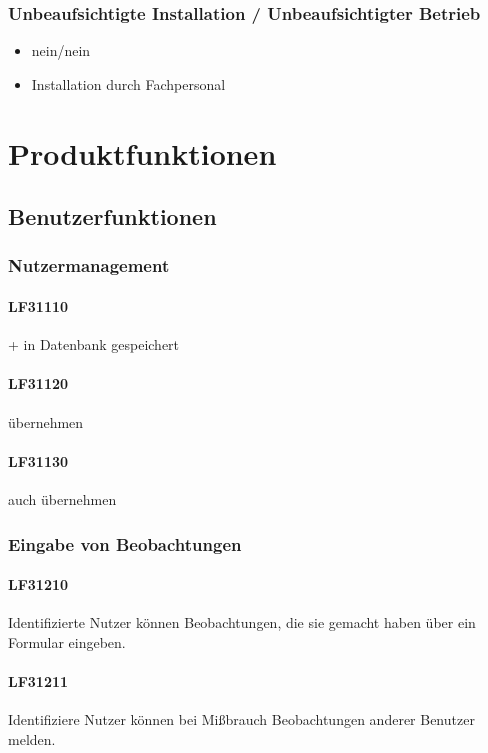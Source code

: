 \documentclass[a4paper,11pt]{article}             %
\begin{document}
\subsubsection{Unbeaufsichtigte Installation / Unbeaufsichtigter Betrieb}
\begin{itemize}
\item nein/nein
\item Installation durch Fachpersonal
\end{itemize}



\section{Produktfunktionen}
	\subsection{Benutzerfunktionen}
		\subsubsection{Nutzermanagement}
			\paragraph{LF31110}
			+ in Datenbank gespeichert
			\paragraph{LF31120}
			übernehmen
			\paragraph{LF31130}
			auch übernehmen
			
		\subsubsection{Eingabe von Beobachtungen}
\paragraph{LF31210}
Identifizierte Nutzer können Beobachtungen, die sie gemacht haben über ein Formular eingeben.
\paragraph{LF31211}
Identifiziere Nutzer können bei Mißbrauch Beobachtungen anderer Benutzer melden.
\end{document}
